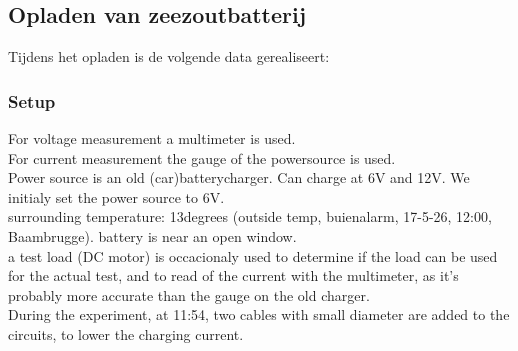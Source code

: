 \begin{table}[h]
\centering
\caption{Berekeningen van energieopslagmethoden per eenheid WORDT BIJLAGE}
\label{tab:prestatievergelijking_uitgebreids}
\end{table}

\subsection{Opladen van zeezoutbatterij}

Tijdens het opladen is de volgende data gerealiseert:
\subsubsection{Setup}
For voltage measurement a multimeter is used.\\
For current measurement the gauge of the powersource is used.\\
Power source is an old (car)batterycharger. Can charge at 6V and 12V. We initialy set the power source to 6V.\\
surrounding temperature: 13degrees (outside temp, buienalarm, 17-5-26, 12:00, Baambrugge). battery is near an open window.\\
a test load (DC motor) is occacionaly used to determine if the load can be used for the actual test, and to read of the current with the multimeter, as it's probably more accurate than the gauge on the old charger.\\
During the experiment, at 11:54, two cables with small diameter are added to the circuits, to lower the charging current.

